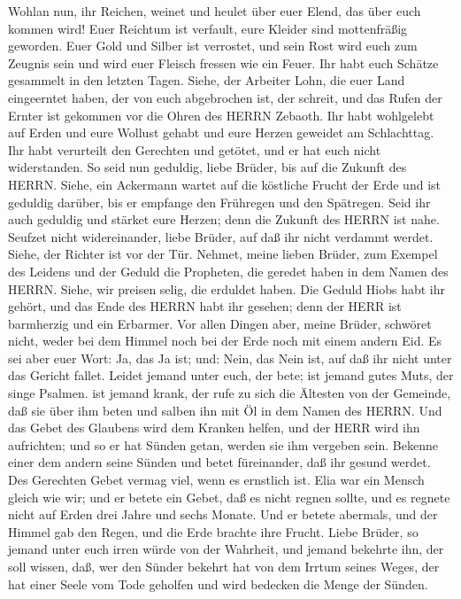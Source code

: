 Wohlan nun, ihr Reichen, weinet und heulet über euer Elend,
das über euch kommen wird!  Euer Reichtum ist verfault, eure
Kleider sind mottenfräßig geworden.  Euer Gold und Silber
ist verrostet, und sein Rost wird euch zum Zeugnis sein und wird euer
Fleisch fressen wie ein Feuer. Ihr habt euch Schätze gesammelt in den
letzten Tagen.  Siehe, der Arbeiter Lohn, die euer Land
eingeerntet haben, der von euch abgebrochen ist, der schreit, und das
Rufen der Ernter ist gekommen vor die Ohren des HERRN Zebaoth.
 Ihr habt wohlgelebt auf Erden und eure Wollust gehabt und
eure Herzen geweidet am Schlachttag.  Ihr habt verurteilt
den Gerechten und getötet, und er hat euch nicht widerstanden.
 So seid nun geduldig, liebe Brüder, bis auf die Zukunft des
HERRN. Siehe, ein Ackermann wartet auf die köstliche Frucht der Erde und
ist geduldig darüber, bis er empfange den Frühregen und den Spätregen.
 Seid ihr auch geduldig und stärket eure Herzen; denn die
Zukunft des HERRN ist nahe.  Seufzet nicht widereinander,
liebe Brüder, auf daß ihr nicht verdammt werdet. Siehe, der Richter ist
vor der Tür.  Nehmet, meine lieben Brüder, zum Exempel des
Leidens und der Geduld die Propheten, die geredet haben in dem Namen des
HERRN.  Siehe, wir preisen selig, die erduldet haben. Die
Geduld Hiobs habt ihr gehört, und das Ende des HERRN habt ihr gesehen;
denn der HERR ist barmherzig und ein Erbarmer.  Vor allen
Dingen aber, meine Brüder, schwöret nicht, weder bei dem Himmel noch bei
der Erde noch mit einem andern Eid. Es sei aber euer Wort: Ja, das Ja
ist; und: Nein, das Nein ist, auf daß ihr nicht unter das Gericht
fallet.  Leidet jemand unter euch, der bete; ist jemand
gutes Muts, der singe Psalmen.  ist jemand krank, der rufe
zu sich die Ältesten von der Gemeinde, daß sie über ihm beten und salben
ihn mit Öl in dem Namen des HERRN.  Und das Gebet des
Glaubens wird dem Kranken helfen, und der HERR wird ihn aufrichten; und
so er hat Sünden getan, werden sie ihm vergeben sein. 
Bekenne einer dem andern seine Sünden und betet füreinander, daß ihr
gesund werdet. Des Gerechten Gebet vermag viel, wenn es ernstlich ist.
 Elia war ein Mensch gleich wie wir; und er betete ein
Gebet, daß es nicht regnen sollte, und es regnete nicht auf Erden drei
Jahre und sechs Monate.  Und er betete abermals, und der
Himmel gab den Regen, und die Erde brachte ihre Frucht. 
Liebe Brüder, so jemand unter euch irren würde von der Wahrheit, und
jemand bekehrte ihn,  der soll wissen, daß, wer den Sünder
bekehrt hat von dem Irrtum seines Weges, der hat einer Seele vom Tode
geholfen und wird bedecken die Menge der Sünden.

